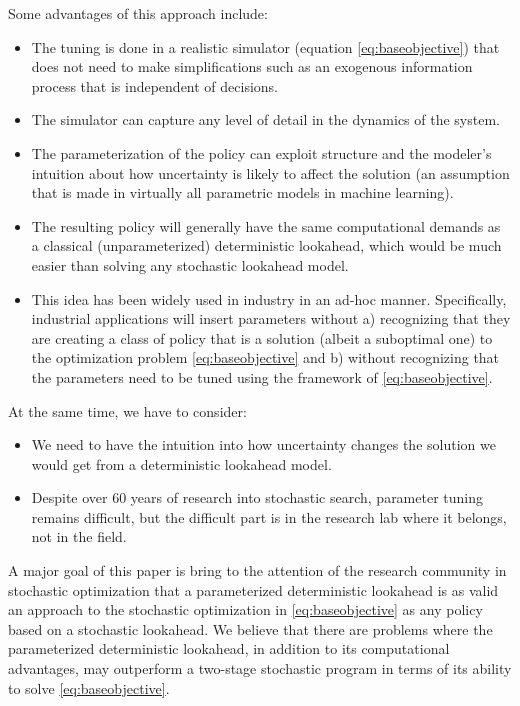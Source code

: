 \documentclass[11pt,oneside,fleqn,reqno,titlepage]{article}
\begin{document}
Some advantages of this approach include:
\begin{itemize}
    \item The tuning is done in a realistic simulator (equation \eqref{eq:baseobjective}) that does not need to make simplifications such as an exogenous information process that is independent of decisions.
    \item The simulator can capture any level of detail in the dynamics of the system.
    \item The parameterization of the policy can exploit structure and the modeler's intuition about how uncertainty is likely to affect the solution (an assumption that is made in virtually all parametric models in machine learning).
    \item The resulting policy will generally have the same computational demands as a classical (unparameterized) deterministic lookahead, which would be much easier than solving any stochastic lookahead model.
    \item This idea has been widely used in industry in an ad-hoc manner.  Specifically, industrial applications will insert parameters without a) recognizing that they are creating a class of policy that is a solution (albeit a suboptimal one) to the optimization problem \eqref{eq:baseobjective} and b) without recognizing that the parameters need to be tuned using the framework of \eqref{eq:baseobjective}.
\end{itemize}
At the same time, we have to consider:
\begin{itemize}
    \item We need to have the intuition into how uncertainty changes the solution we would get from a deterministic lookahead model.
    \item Despite over 60 years of research into stochastic search, parameter tuning remains difficult, but the difficult part is in the research lab where it belongs, not in the field.
\end{itemize}

A major goal of this paper is bring to the attention of the research community in stochastic optimization that a parameterized deterministic lookahead is as valid an approach to the stochastic optimization in \eqref{eq:baseobjective} as any policy based on a stochastic lookahead.  We believe that there are problems where the parameterized deterministic lookahead, in addition to its computational advantages, may outperform a two-stage stochastic program in terms of its ability to solve \eqref{eq:baseobjective}.
\end{document}
